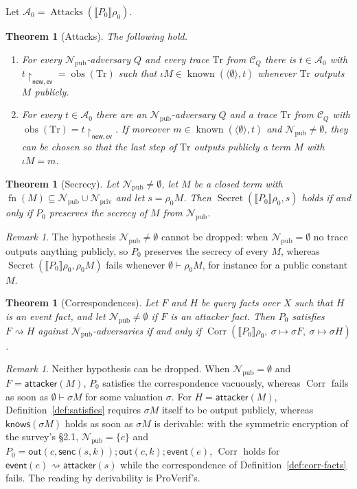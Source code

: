 \documentclass[11pt]{article}
\theoremstyle{definition}
\theoremstyle{plain}
\newtheorem{theorem}[definition]{Theorem}
\theoremstyle{remark}
\newtheorem{remark}[definition]{Remark}
\newcommand{\anew}{\mathsf{new}}
\newcommand{\aev}{\mathsf{ev}}
\newcommand{\known}{\operatorname{known}}
\newcommand{\knows}{\pv{knows}}
\newcommand{\Attacks}{\operatorname{Attacks}}
\newcommand{\Secret}{\operatorname{Secret}}
\newcommand{\Corr}{\operatorname{Corr}}
\newcommand{\sem}[1]{\llbracket #1 \rrbracket}
\newcommand{\pv}[1]{\mathsf{#1}}
\newcommand{\Npub}{\mathcal{N}_{\mathrm{pub}}}
\newcommand{\Npriv}{\mathcal{N}_{\mathrm{priv}}}
\newcommand{\fn}{\operatorname{fn}}
\newcommand{\obs}{\operatorname{obs}}
\newcommand{\attacker}{\pv{attacker}}
\newcommand{\event}{\pv{event}}
\newcommand{\CQ}{\mathcal{C}_Q}
\newcommand{\Azero}{\mathcal{A}_0}
\begin{document}
Let $\Azero=\Attacks(\sem{P_0}\rho_0)$.

\begin{theorem}[Attacks]\label{thm:A}
The following hold.
\begin{enumerate}
\item[(S)] For every $\Npub$-adversary $Q$ and every trace $\mathrm{Tr}$ from $\CQ$ there is $t\in\Azero$ with $t{\restriction}_{\anew,\aev}=\obs(\mathrm{Tr})$ such that $\iota M\in\known(\langle\emptyset\rangle,t)$ whenever $\mathrm{Tr}$ outputs $M$ publicly.
\item[(C)] For every $t\in\Azero$ there are an $\Npub$-adversary $Q$ and a trace $\mathrm{Tr}$ from $\CQ$ with $\obs(\mathrm{Tr})=t{\restriction}_{\anew,\aev}$. If moreover $m\in\known(\langle\emptyset\rangle,t)$ and $\Npub\ne\emptyset$, they can be chosen so that the last step of $\mathrm{Tr}$ outputs publicly a term $M$ with $\iota M=m$.
\end{enumerate}
\end{theorem}

\begin{theorem}[Secrecy]\label{thm:secrecy}
Let $\Npub\ne\emptyset$, let $M$ be a closed term with $\fn(M)\subseteq\Npub\cup\Npriv$ and let $s=\rho_0M$. Then $\Secret(\sem{P_0}\rho_0,s)$ holds if and only if $P_0$ preserves the secrecy of $M$ from $\Npub$.
\end{theorem}

\begin{remark}
The hypothesis $\Npub\ne\emptyset$ cannot be dropped: when $\Npub=\emptyset$ no trace outputs anything publicly, so $P_0$ preserves the secrecy of every $M$, whereas $\Secret(\sem{P_0}\rho_0,\rho_0M)$ fails whenever $\emptyset\vdash\rho_0M$, for instance for a public constant $M$.
\end{remark}

\begin{theorem}[Correspondences]\label{thm:corr}
Let $F$ and $H$ be query facts over $X$ such that $H$ is an event fact, and let $\Npub\ne\emptyset$ if $F$ is an attacker fact. Then $P_0$ satisfies $F\rightsquigarrow H$ against $\Npub$-adversaries if and only if $\Corr(\sem{P_0}\rho_0,\ \sigma\mapsto\sigma F,\ \sigma\mapsto\sigma H)$.
\end{theorem}

\begin{remark}
Neither hypothesis can be dropped. When $\Npub=\emptyset$ and $F=\attacker(M)$, $P_0$ satisfies the correspondence vacuously, whereas $\Corr$ fails as soon as $\emptyset\vdash\sigma M$ for some valuation $\sigma$. For $H=\attacker(M)$, Definition~\ref{def:satisfies} requires $\sigma M$ itself to be output publicly, whereas $\knows(\sigma M)$ holds as soon as $\sigma M$ is derivable: with the symmetric encryption of the survey's \S2.1, $\Npub=\{c\}$ and $P_0=\pv{out}(c,\pv{senc}(s,k));\pv{out}(c,k);\pv{event}(e)$, $\Corr$ holds for $\event(e)\rightsquigarrow\attacker(s)$ while the correspondence of Definition~\ref{def:corr-facts} fails. The reading by derivability is ProVerif's.
\end{remark}
\end{document}
